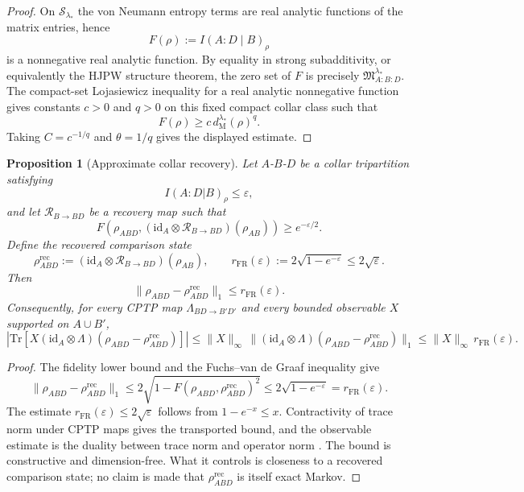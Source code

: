 \documentclass[11pt]{article}
\newtheorem{proposition}[theorem]{Proposition}
\begin{document}
\begin{proof}
On \(\mathcal S_{\lambda_\ast}\) the von Neumann entropy terms are real
analytic functions of the matrix entries, hence
\[
F(\rho):=I(A:D\mid B)_\rho
\]
is a nonnegative real analytic function. By equality in strong subadditivity,
or equivalently the HJPW structure theorem, the zero set of \(F\) is precisely
\(\mathfrak M_{A:B:D}^{\lambda_\ast}\). The compact-set Lojasiewicz inequality
for a real analytic nonnegative function gives constants \(c>0\) and \(q>0\)
on this fixed compact collar class such that
\[
F(\rho)\ge c\,d_{\mathrm M}^{\lambda_\ast}(\rho)^q .
\]
Taking \(C=c^{-1/q}\) and \(\theta=1/q\) gives the displayed estimate.
\end{proof}

\begin{proposition}[Approximate collar recovery]\label{prop:approxrecover}
Let \(A\)-\(B\)-\(D\) be a collar tripartition satisfying
\[
I(A:D|B)_\rho\le \varepsilon,
\]
and let $\mathcal R_{B\to BD}$ be a recovery map such that
\[
F\!\left(\rho_{ABD},(\mathrm{id}_A\otimes \mathcal R_{B\to BD})(\rho_{AB})\right)\ge e^{-\varepsilon/2}.
\]
Define the recovered comparison state
\[
\rho^{\mathrm{rec}}_{ABD}:=(\mathrm{id}_A\otimes \mathcal R_{B\to BD})(\rho_{AB}),
\qquad
r_{\mathrm{FR}}(\varepsilon):=2\sqrt{1-e^{-\varepsilon}}\le 2\sqrt{\varepsilon}.
\]
Then
\[
\|\rho_{ABD}-\rho^{\mathrm{rec}}_{ABD}\|_1\le r_{\mathrm{FR}}(\varepsilon).
\]
Consequently, for every CPTP map \(\Lambda_{BD\to B'D'}\) and every bounded observable \(X\) supported on \(A\cup B'\),
\[
\left|\mathrm{Tr}\!\left[X(\mathrm{id}_A\otimes \Lambda)(\rho_{ABD}-\rho^{\mathrm{rec}}_{ABD})\right]\right|
\le
\|X\|_\infty\,\|(\mathrm{id}_A\otimes \Lambda)(\rho_{ABD}-\rho^{\mathrm{rec}}_{ABD})\|_1
\le
\|X\|_\infty\,r_{\mathrm{FR}}(\varepsilon).
\]
\end{proposition}

\begin{proof}
The fidelity lower bound and the Fuchs--van de Graaf inequality give
\[
\|\rho_{ABD}-\rho^{\mathrm{rec}}_{ABD}\|_1
\le
2\sqrt{1-F(\rho_{ABD},\rho^{\mathrm{rec}}_{ABD})^2}
\le
2\sqrt{1-e^{-\varepsilon}}
=
r_{\mathrm{FR}}(\varepsilon).
\]
The estimate \(r_{\mathrm{FR}}(\varepsilon)\le 2\sqrt{\varepsilon}\) follows from \(1-e^{-x}\le x\). Contractivity of trace norm under CPTP maps gives the transported bound, and the observable estimate is the duality between trace norm and operator norm \cite{fawziRenner15}. The bound is constructive and dimension-free. What it controls is closeness to a recovered comparison state; no claim is made that \(\rho^{\mathrm{rec}}_{ABD}\) is itself exact Markov.
\end{proof}
\end{document}
